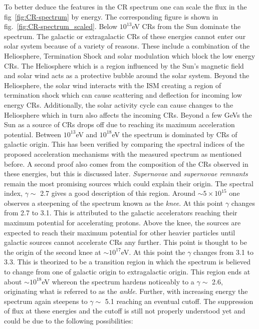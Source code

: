 To better deduce the features in the \gls{CR} spectrum one can scale the flux in the fig~\ref{fig:CR-spectrum} by energy. The corresponding figure is shown in fig.~\ref{fig:CR-spectrum_scaled}. Below $10^{13}$eV \glspl{CR} from the Sun dominate the spectrum. The galactic or extragalactic \glspl{CR} of these energies cannot enter our solar system because of a variety of reasons. These include a combination of the Heliosphere, Termination Shock and solar modulation which block the low energy \glspl{CR}. The Heliosphere which is a region influenced by the Sun's magnetic field and solar wind acts as a protective bubble around the solar system. Beyond the Heliosphere, the solar wind interacts with the ISM creating a region of termination shock which can cause scattering and deflection for incoming low energy \glspl{CR}. Additionally, the solar activity cycle can cause changes to the Heliosphere which in turn also affects the incoming \glspl{CR}. Beyond a few GeVs the Sun as a source of \glspl{CR} drops off due to reaching its maximum acceleration potential. Between $10^{13}$eV and $10^{18}$eV the spectrum is dominated by \glspl{CR} of galactic origin. This has been verified by comparing the spectral indices of the proposed acceleration mechanisms with the measured spectrum as mentioned before. A second proof also comes from the composition of the \glspl{CR} observed in these energies, but this is discussed later. \textit{Supernovae} and \textit{supernovae remnants} remain the most promising sources which could explain their origin. The spectral index, $\gamma \sim$ 2.7 gives a good description of this region. Around $\sim5 \times 10^{15}$ one observes a steepening of the spectrum known as the \textit{knee}. At this point $\gamma$ changes from 2.7 to 3.1. This is attributed to the galactic accelerators reaching their maximum potential for accelerating protons. Above the knee, the sources are expected to reach their maximum potential for other heavier particles until galactic sources cannot accelerate \glspl{CR} any further. This point is thought to be the origin of the second knee at $\sim 10^{17}$eV. At this point the $\gamma$ changes from 3.1 to 3.3. This is theorized to be a transition region in which the spectrum is believed to change from one of galactic origin to extragalactic origin. This region ends at about $\sim 10^{18}$eV whereon the spectrum hardens noticeably to a $\gamma \sim$ 2.6, originating what is referred to as the \textit{ankle}. Further, with increasing energy the spectrum again steepens to $\gamma \sim$ 5.1 reaching an eventual cutoff. The suppression of flux at these energies and the cutoff is still not properly understood yet and could be due to the following possibilities:

